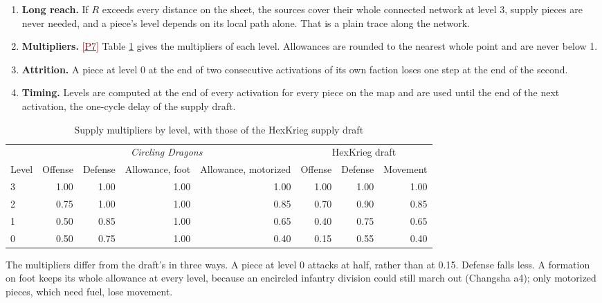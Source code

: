 \documentclass[11pt]{article}
\newcommand{\ptest}[1]{\hyperlink{ptest}{\textcolor{darkred}{[P#1]}}}
\begin{document}
\begin{enumerate}
\item \textbf{Long reach.} If $R$ exceeds every distance on the sheet, the sources cover their whole connected network at level 3, supply pieces are never needed, and a piece's level depends on its local path alone. That is a plain trace along the network.
\item \textbf{Multipliers.} \ptest{7} Table \ref{tab:supply} gives the multipliers of each level. Allowances are rounded to the nearest whole point and are never below 1.
\item \textbf{Attrition.} A piece at level 0 at the end of two consecutive activations of its own faction loses one step at the end of the second.
\item \textbf{Timing.} Levels are computed at the end of every activation for every piece on the map and are used until the end of the next activation, the one-cycle delay of the supply draft.
\end{enumerate}

\begin{table}[ht]
\centering\small
\begin{tabular}{@{}lrrrr@{\qquad}rrr@{}}
\toprule
& \multicolumn{4}{c}{\emph{Circling Dragons}} & \multicolumn{3}{c}{HexKrieg draft} \\
Level & Offense & Defense & Allowance, foot & Allowance, motorized & Offense & Defense & Movement \\
\midrule
3 & 1.00 & 1.00 & 1.00 & 1.00 & 1.00 & 1.00 & 1.00 \\
2 & 0.75 & 1.00 & 1.00 & 0.85 & 0.70 & 0.90 & 0.85 \\
1 & 0.50 & 0.85 & 1.00 & 0.65 & 0.40 & 0.75 & 0.65 \\
0 & 0.50 & 0.75 & 1.00 & 0.40 & 0.15 & 0.55 & 0.40 \\
\bottomrule
\end{tabular}
\caption{Supply multipliers by level, with those of the HexKrieg supply draft}\label{tab:supply}
\end{table}

The multipliers differ from the draft's in three ways. A piece at level 0 attacks at half, rather than at 0.15. Defense falls less. A formation on foot keeps its whole allowance at every level, because an encircled infantry division could still march out (Changsha a4); only motorized pieces, which need fuel, lose movement.
\end{document}
